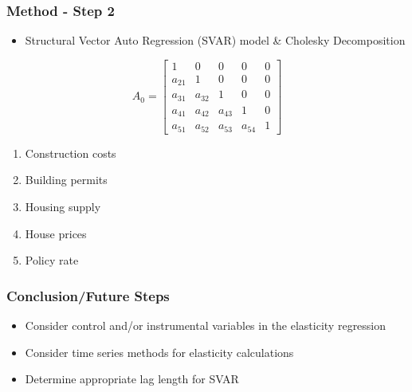 \documentclass{beamer}
\begin{document}
\begin{frame}
\frametitle{Method - Step 2}
\begin{itemize}
    \item Structural Vector Auto Regression (SVAR) model \& Cholesky Decomposition
    
\end{itemize}

\[
A_0 =
\begin{bmatrix}
1 & 0 & 0 & 0 & 0 \\
a_{21} & 1 & 0 & 0 &0\\
a_{31} & a_{32} & 1 & 0 &0\\
a_{41} & a_{42} & a_{43} & 1 &0 \\a_{51} & a_{52} & a_{53} & a_{54} & 1
\end{bmatrix}
\]

\begin{enumerate}
    \item Construction costs
    \item Building permits
    \item Housing supply
    \item House prices
    \item Policy rate

\end{enumerate}
\end{frame}

\begin{frame}
\frametitle{Conclusion/Future Steps}
   
\begin{itemize}
\setlength{\itemsep}{1.5\baselineskip} %
    \item Consider control and/or instrumental variables in the elasticity regression
    \item Consider time series methods for elasticity calculations
    \item Determine appropriate lag length for SVAR 
\end{itemize}
\end{frame}
\end{document}
